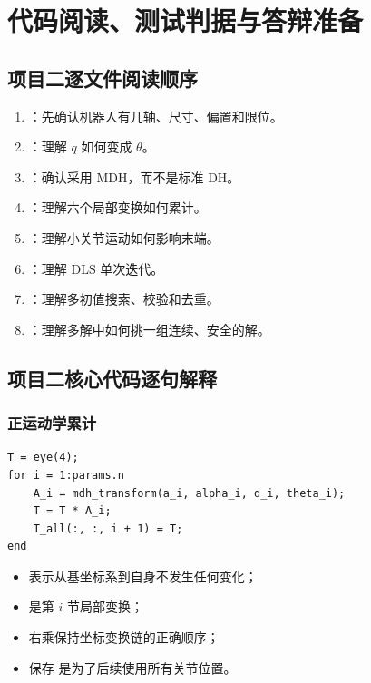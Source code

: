 \chapter{代码阅读、测试判据与答辩准备}

\section{项目二逐文件阅读顺序}

\begin{enumerate}
  \item {}：先确认机器人有几轴、尺寸、偏置和限位。
  \item {}：理解 $q$ 如何变成 $\theta$。
  \item {}：确认采用 MDH，而不是标准 DH。
  \item {}：理解六个局部变换如何累计。
  \item {}：理解小关节运动如何影响末端。
  \item {}：理解 DLS 单次迭代。
  \item {}：理解多初值搜索、校验和去重。
  \item {}：理解多解中如何挑一组连续、安全的解。
\end{enumerate}

\section{项目二核心代码逐句解释}

\subsection{正运动学累计}

\begin{lstlisting}
T = eye(4);
for i = 1:params.n
    A_i = mdh_transform(a_i, alpha_i, d_i, theta_i);
    T = T * A_i;
    T_all(:, :, i + 1) = T;
end
\end{lstlisting}

\begin{itemize}
  \item {} 表示从基坐标系到自身不发生任何变化；
  \item {} 是第 $i$ 节局部变换；
  \item 右乘保持坐标变换链的正确顺序；
  \item 保存  是为了后续使用所有关节位置。
\end{itemize}

